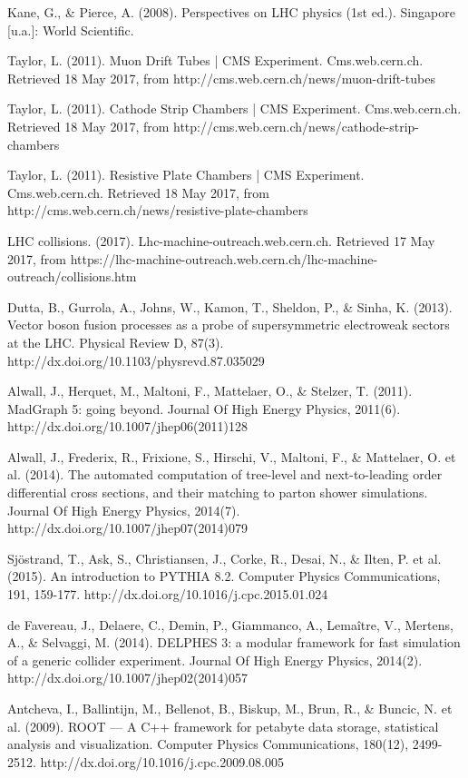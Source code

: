 \documentclass[11pt]{book}
\begin{document}
\begin{thebibliography}{10}
 Kane, G., \& Pierce, A. (2008). Perspectives on LHC physics (1st ed.). Singapore [u.a.]: World Scientific.

 Taylor, L. (2011). Muon Drift Tubes | CMS Experiment. Cms.web.cern.ch. Retrieved 18 May 2017, from http://cms.web.cern.ch/news/muon-drift-tubes

 Taylor, L. (2011). Cathode Strip Chambers | CMS Experiment. Cms.web.cern.ch. Retrieved 18 May 2017, from http://cms.web.cern.ch/news/cathode-strip-chambers

  Taylor, L. (2011). Resistive Plate Chambers | CMS Experiment. Cms.web.cern.ch. Retrieved 18 May 2017, from http://cms.web.cern.ch/news/resistive-plate-chambers

 LHC collisions. (2017). Lhc-machine-outreach.web.cern.ch. Retrieved 17 May 2017, from https://lhc-machine-outreach.web.cern.ch/lhc-machine-outreach/collisions.htm

 Dutta, B., Gurrola, A., Johns, W., Kamon, T., Sheldon, P., \& Sinha, K. (2013). Vector boson fusion processes as a probe of supersymmetric electroweak sectors at the LHC. Physical Review D, 87(3). http://dx.doi.org/10.1103/physrevd.87.035029  

 Alwall, J., Herquet, M., Maltoni, F., Mattelaer, O., \& Stelzer, T. (2011).   MadGraph 5: going beyond. Journal Of High Energy Physics, 2011(6). http://dx.doi.org/10.1007/jhep06(2011)128  

 Alwall, J., Frederix, R., Frixione, S., Hirschi, V., Maltoni, F., \& Mattelaer, O. et al. (2014). The automated computation of tree-level and next-to-leading order differential cross sections, and their matching to parton shower simulations. Journal Of High Energy Physics, 2014(7). http://dx.doi.org/10.1007/jhep07(2014)079  

 Sjöstrand, T., Ask, S., Christiansen, J., Corke, R., Desai, N., \& Ilten, P. et al. (2015). An introduction to PYTHIA 8.2. Computer Physics Communications, 191, 159-177. http://dx.doi.org/10.1016/j.cpc.2015.01.024

 de Favereau, J., Delaere, C., Demin, P., Giammanco, A., Lemaître, V., Mertens, A., \& Selvaggi, M. (2014). DELPHES 3: a modular framework for fast simulation of a generic collider experiment. Journal Of High Energy Physics, 2014(2). http://dx.doi.org/10.1007/jhep02(2014)057  

 Antcheva, I., Ballintijn, M., Bellenot, B., Biskup, M., Brun, R., \& Buncic, N. et al.   (2009). ROOT — A C++ framework for petabyte data storage, statistical analysis and visualization. Computer Physics Communications, 180(12), 2499-2512. http://dx.doi.org/10.1016/j.cpc.2009.08.005   


\end{thebibliography}
\end{document}
